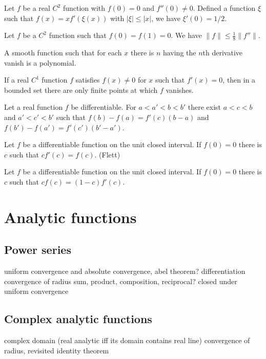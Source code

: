 \documentclass{../note}
\begin{document}
\begin{prb}
Let $f$ be a real $C^2$ function with $f(0)=0$ and $f''(0)\ne0$.
Defined a function $\xi$ such that $f(x)=xf'(\xi(x))$ with $|\xi|\le|x|$, we have $\xi'(0)=1/2$.
\end{prb}

\begin{prb}
Let $f$ be a $C^2$ function such that $f(0)=f(1)=0$.
We have $\|f\|\le\frac18\|f''\|$.
\end{prb}

\begin{prb}
A smooth function such that for each $x$ there is $n$ having the $n$th derivative vanish is a polynomial.
\end{prb}

\begin{prb}
If a real $C^1$ function $f$ satisfies $f(x)\ne0$ for $x$ such that $f'(x)=0$, then in a bounded set there are only finite points at which $f$ vanishes.
\end{prb}

\begin{prb}
Let a real function $f$ be differentiable.
For $a<a'<b<b'$ there exist $a<c<b$ and $a'<c'<b'$ such that $f(b)-f(a)=f'(c)(b-a)$ and $f(b')-f(a')=f'(c')(b'-a')$.
\end{prb}

\begin{prb}
Let $f$ be a differentiable function on the unit closed interval.
If $f(0)=0$ there is $c$ such that $cf'(c)=f(c)$. (Flett)
\end{prb}

\begin{prb}
Let $f$ be a differentiable function on the unit closed interval.
If $f(0)=0$ there is $c$ such that $cf(c)=(1-c)f'(c)$.
\end{prb}


\chapter{Analytic functions}
\section{Power series}
uniform convergence and absolute convergence, abel theorem?
differentiation
convergence of radius
sum, product, composition, reciprocal?
closed under uniform convergence
\section{Complex analytic functions}
complex domain
(real analytic iff its domain contains real line)
convergence of radius, revisited
identity theorem
\end{document}
